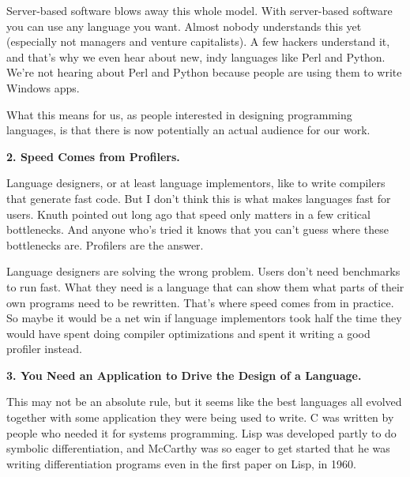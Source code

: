 Server-based
                    software blows away this whole model. With server-based
                    software you can use any language you want. Almost nobody
                    understands this yet (especially not managers and venture
                    capitalists). A few hackers understand it, and that's why we
                    even hear about new, indy languages like Perl and Python.
                    We're not hearing about Perl and Python because people are
                    using them to write Windows apps.

What this means
                    for us, as people interested in designing programming
                    languages, is that there is now potentially an actual
                    audience for our work.

\textbf{2. Speed Comes from Profilers.}

Language designers, or at least language
                    implementors, like to write compilers that generate fast
                    code. But I don't think this is what makes languages fast
                    for users. Knuth pointed out long ago that speed only
                    matters in a few critical bottlenecks. And anyone who's
                    tried it knows that you can't guess where these bottlenecks
                    are. Profilers are the answer.

Language designers
                    are solving the wrong problem. Users don't need benchmarks
                    to run fast. What they need is a language that can show them
                    what parts of their own programs need to be rewritten.
                    That's where speed comes from in practice. So maybe it would
                    be a net win if language implementors took half the time
                    they would have spent doing compiler optimizations and spent
                    it writing a good profiler instead.

\textbf{3. You Need an Application to Drive the Design of a
                      Language.}

This may not be an absolute rule, but it seems
                    like the best languages all evolved together with some
                    application they were being used to write. C was written by
                    people who needed it for systems programming. Lisp was
                    developed partly to do symbolic differentiation, and
                    McCarthy was so eager to get started that he was writing
                    differentiation programs even in the first paper on Lisp, in
                    1960.

